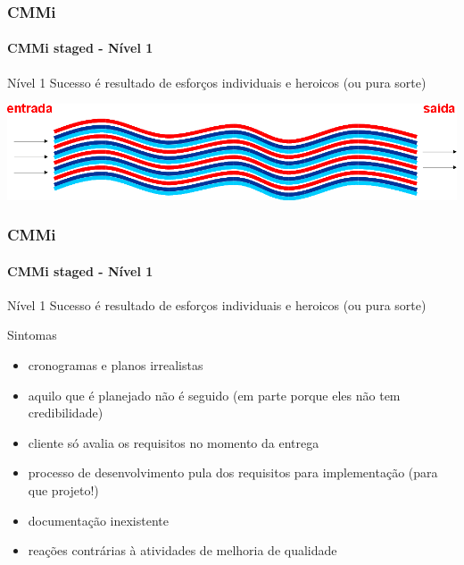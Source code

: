 \begin{frame}
	\frametitle{CMMi}
	\framesubtitle{CMMi staged - Nível 1}
	
	\begin{block:fact}{Nível 1}
		Sucesso é resultado de esforços individuais e heroicos (ou pura sorte)
	\end{block:fact}
	
	\begin{block:fact}{}
		\centering
		\includegraphics[width=\textwidth]{software-engineering/project-management/process/process-quality/cmmi/cmmi-staged-1}
	\end{block:fact}
\end{frame}


\begin{frame}
	\frametitle{CMMi}
	\framesubtitle{CMMi staged - Nível 1}
	
	\begin{block:fact}{Nível 1}
		Sucesso é resultado de esforços individuais e heroicos (ou pura sorte)
	\end{block:fact}
	
	\begin{block:fact}{Sintomas}
		\begin{itemize}
			\item cronogramas e planos irrealistas
			\item aquilo que é planejado não é seguido (em parte porque eles não tem credibilidade)
			\item cliente só avalia os requisitos no momento da 	entrega
			\item processo de desenvolvimento pula dos requisitos para implementação (para que projeto!)
			\item documentação inexistente
			\item reações contrárias à atividades de melhoria de qualidade
		\end{itemize}
	\end{block:fact}
\end{frame}


